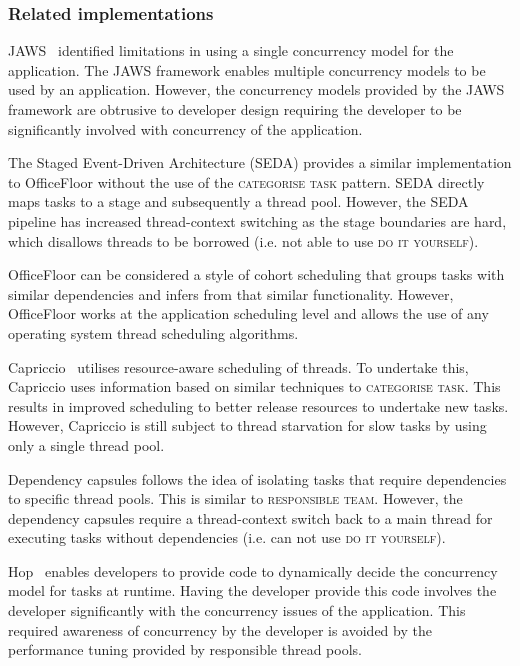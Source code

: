 \documentclass[prodmode]{style/acmlarge}
\begin{document}
\subsubsection*{Related implementations}

JAWS~\cite{jaws} identified limitations in using a single concurrency model for
the application.  The JAWS framework enables multiple concurrency models to be
used by an application.  However, the concurrency models provided by the JAWS
framework are obtrusive to developer design requiring the developer to be
significantly involved with concurrency of the application.

The Staged Event-Driven Architecture (SEDA) \cite{seda} provides a similar
implementation to OfficeFloor without the use of the \textsc{categorise task}
pattern.  SEDA directly maps tasks to a stage and subsequently a thread pool.
However, the SEDA pipeline has increased thread-context switching as the stage
boundaries are hard, which disallows threads to be borrowed (i.e. not able to
use \textsc{do it yourself}).

OfficeFloor can be considered a style of cohort scheduling \cite{cohort}
that groups tasks with similar dependencies and infers from that similar
functionality.  However, OfficeFloor works at the application scheduling
level and allows the use of any operating system thread scheduling algorithms.

Capriccio~\cite{capriccio} utilises resource-aware scheduling of threads.  To
undertake this, Capriccio uses information based on similar techniques to
\textsc{categorise task}.  This results in improved scheduling to better release
resources to undertake new tasks.  However, Capriccio is still subject to thread
starvation for slow tasks by using only a single thread pool.

Dependency capsules \cite{dependency-capsules} follows the idea of isolating
tasks that require dependencies to specific thread pools.  This is similar to
\textsc{responsible team}.  However, the dependency capsules require a
thread-context switch back to a main thread for executing tasks without
dependencies (i.e. can not use \textsc{do it yourself}).

Hop~\cite{hop} enables developers to provide code to dynamically decide the
concurrency model for tasks at runtime.  Having the developer provide this code
involves the developer significantly with the concurrency issues of the
application.  This required awareness of concurrency by the developer is
avoided by the performance tuning provided by responsible thread pools.
\end{document}
